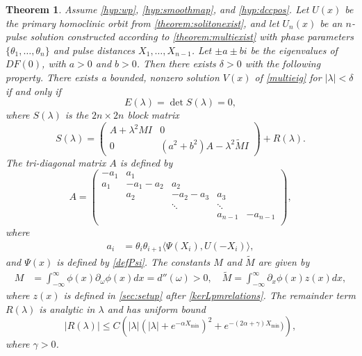 \documentclass[12pt]{elsarticle}
\newtheorem{theorem}{Theorem}
\begin{document}
\begin{theorem}\label{th:blockmatrix}
Assume \cref{hyp:wp}, \cref{hyp:smoothmap}, and \cref{hyp:dccpos}. Let $U(x)$ be the primary homoclinic orbit from \cref{theorem:solitonexist}, and let $U_n(x)$ be an $n$-pulse solution constructed according to \cref{theorem:multiexist} with phase parameters $\{ \theta_1, \dots, \theta_n \}$ and pulse distances $X_1, \dots, X_{n-1}$. Let $\pm a \pm bi$ be the eigenvalues of $DF(0)$, with $a > 0$ and $b > 0$. Then there exists $\delta > 0$ with the following property. There exists a bounded, nonzero solution $V(x)$ of \cref{multieig} for $|\lambda| < \delta$ if and only if
\begin{equation}\label{blockmatrixcond}
E(\lambda) = \det S(\lambda) = 0,
\end{equation}
where $S(\lambda)$ is the $2n \times 2n$ block matrix
\begin{equation}\label{blockeq}
S(\lambda) = 
\begin{pmatrix}
A + \lambda^2 M I & 0 \\
0 & (a^2 + b^2) A - \lambda^2 \tilde{M} I
\end{pmatrix} + R(\lambda).
\end{equation}
The tri-diagonal matrix $A$ is defined by
\begin{equation*}
A = \begin{pmatrix}
-a_1 & a_1 \\
a_1 & -a_1 - a_2 &  a_2 \\
& a_2 & -a_2 - a_3 &  a_3 \\
& & \ddots & \ddots \\
& & &  a_{n-1} & -a_{n-1} \\
\end{pmatrix},
\end{equation*}
where
\begin{align*}
a_i &= \theta_i \theta_{i+1} \langle \Psi(X_i), U(-X_i) \rangle,
\end{align*}
and $\Psi(x)$ is defined by \cref{defPsi}. The constants $M$ and $\tilde{M}$ are given by
\begin{align*}
M &= \int_{-\infty}^\infty \phi(x) \partial_\omega \phi(x) dx = d''(\omega) > 0, \quad
\tilde{M} = \int_{-\infty}^\infty \partial_x \phi(x) z(x) dx,
\end{align*}
where $z(x)$ is defined in \cref{sec:setup} after \cref{kerLpmrelations}. The remainder term $R(\lambda)$ is analytic in $\lambda$ and has uniform bound
\[
|R(\lambda)| \leq C\left( |\lambda|(|\lambda| + e^{-\alpha X_{\min}})^2 + e^{-(2 \alpha + \gamma)X_{\min} }) \right),
\]
where $\gamma > 0$.
\end{theorem}
\end{document}
